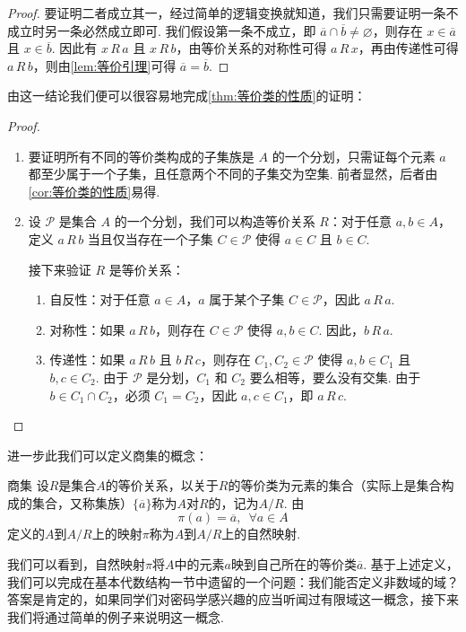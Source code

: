 \begin{proof}
    要证明二者成立其一，经过简单的逻辑变换就知道，我们只需要证明一条不成立时另一条必然成立即可. 我们假设第一条不成立，即 $\overline{a}\cap\overline{b}\neq\varnothing$，则存在 $x \in \overline{a}$ 且 $x \in \overline{b}$. 因此有 $x \,R\, a$ 且 $x \,R\, b$，由等价关系的对称性可得 $a \,R\, x$，再由传递性可得 $a \,R\, b$，则由\autoref{lem:等价引理}可得 $\overline{a}=\overline{b}$.
\end{proof}

由这一结论我们便可以很容易地完成\autoref{thm:等价类的性质}的证明：

\begin{proof}
\begin{enumerate}
    \item 要证明所有不同的等价类构成的子集族是 $A$ 的一个分划，只需证每个元素 $a$ 都至少属于一个子集，且任意两个不同的子集交为空集. 前者显然，后者由\autoref{cor:等价类的性质}易得.
    \item 设 $ \mathcal{P} $ 是集合 $ A $ 的一个分划，我们可以构造等价关系 $ R $：对于任意 $ a, b \in A $，定义 $ a \,R\, b $ 当且仅当存在一个子集 $ C \in \mathcal{P} $ 使得 $ a \in C $ 且 $ b \in C $.

    接下来验证 $R$ 是等价关系：
    \begin{enumerate}
        \item 自反性：对于任意 $ a \in A $，$ a $ 属于某个子集 $ C \in \mathcal{P} $，因此 $ a \,R\, a $.
        \item 对称性：如果 $ a \,R\, b $，则存在 $ C \in \mathcal{P} $ 使得 $ a, b \in C $. 因此，$ b \,R\, a $.
        \item 传递性：如果 $ a \,R\, b $ 且 $ b \,R\, c $，则存在 $ C_1, C_2 \in \mathcal{P} $ 使得 $ a, b \in C_1 $ 且 $ b, c \in C_2 $. 由于 $ \mathcal{P} $ 是分划，$ C_1 $ 和 $ C_2 $ 要么相等，要么没有交集. 由于 $ b \in C_1 \cap C_2 $，必须 $ C_1 = C_2 $，因此 $ a, c \in C_1 $，即 $ a \,R\, c $.
    \end{enumerate}
\end{enumerate}
\end{proof}

进一步此我们可以定义商集的概念：
\begin{definition}{商集}{} 
    设$R$是集合$A$的等价关系，以关于$R$的等价类为元素的集合（实际上是集合构成的集合，又称集族）$\{\overline{a}\}$称为$A$对$R$的，记为$A/R$. 由
    \[\pi(a) = \overline{a}, \enspace \forall a\in A\]
    定义的$A$到$A/R$上的映射$\pi$称为$A$到$A/R$上的自然映射.
\end{definition}
我们可以看到，自然映射$\pi$将$A$中的元素$a$映到自己所在的等价类$\overline{a}$. 基于上述定义，我们可以完成在基本代数结构一节中遗留的一个问题：我们能否定义非数域的域？答案是肯定的，如果同学们对密码学感兴趣的应当听闻过有限域这一概念，接下来我们将通过简单的例子来说明这一概念.

